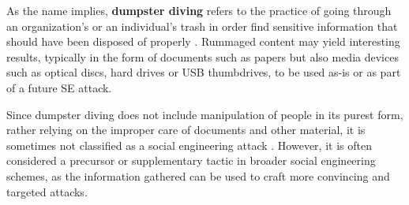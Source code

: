 
As the name implies, \textbf{dumpster diving} refers to the practice of going through an organization's or an individual's trash in order find sensitive information that should have been disposed of properly \citep{syafitri_social_2022}. Rummaged content may yield interesting results, typically in the form of documents such as papers but also media devices such as optical discs, hard drives or USB thumbdrives, to be used as-is or as part of a future SE attack.

Since dumpster diving does not include manipulation of people in its purest form, rather relying on the improper care of documents and other material, it is sometimes not classified as a social engineering attack \citep{wang_defining_2020}. However, it is often considered a precursor or supplementary tactic in broader social engineering schemes, as the information gathered can be used to craft more convincing and targeted attacks.












